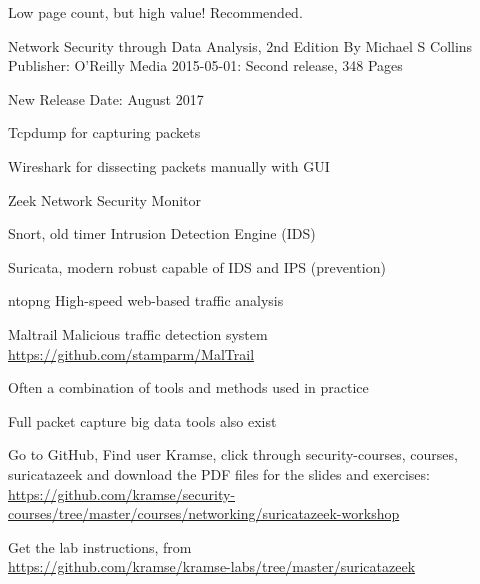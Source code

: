 \documentclass[Screen16to9,17pt]{foils}
\begin{document}

Low page count, but high value! Recommended.

Network Security through Data Analysis, 2nd Edition
By Michael S Collins
Publisher: O'Reilly Media
2015-05-01: Second release, 348 Pages

New Release Date: August 2017




\begin{list1}
\item Tcpdump for capturing packets
\item Wireshark for dissecting packets manually with GUI
\item Zeek Network Security Monitor
\item Snort, old timer Intrusion Detection Engine (IDS)
\item Suricata, modern robust capable of IDS and IPS (prevention)
\item ntopng High-speed web-based traffic analysis
\item Maltrail Malicious traffic detection system \url{https://github.com/stamparm/MalTrail}
\end{list1}

\vskip 5mm
\centerline{Often a combination of tools and methods used in practice}

Full packet capture big data tools also exist




\begin{list2}
\item Go to GitHub, Find user Kramse, click through security-courses, courses, suricatazeek and download the PDF files for the slides and exercises:\\  {\footnotesize \url{https://github.com/kramse/security-courses/tree/master/courses/networking/suricatazeek-workshop}}

\item Get the lab instructions, from\\ {\footnotesize\url{https://github.com/kramse/kramse-labs/tree/master/suricatazeek}}
\end{list2}



\end{document}
